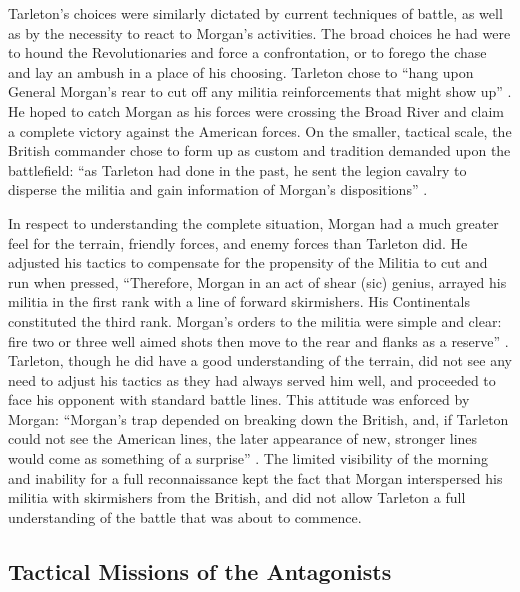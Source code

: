 Tarleton's choices were similarly dictated by current techniques of battle, as
well as by the necessity to react to Morgan's activities.  The broad choices he
had were to hound the Revolutionaries and force a confrontation, or to forego
the chase and lay an ambush in a place of his choosing.  Tarleton chose to ``hang
upon General Morgan's rear to cut off any militia reinforcements that might show
up'' \cite[46]{fleming_cowpens_1988}.  He hoped to catch Morgan as his forces were crossing the
Broad River and claim a complete victory against the American forces.  On the
smaller, tactical scale, the British commander chose to form up as custom and
tradition demanded upon the battlefield:  ``as Tarleton had done in the past, he
sent the legion cavalry to disperse the militia and gain information of Morgan's
dispositions'' \cite[33]{brinkley_back_1998}.

In respect to understanding the complete situation, Morgan had a much greater
feel for the terrain, friendly forces, and enemy forces than Tarleton did.  He
adjusted his tactics to compensate for the propensity of the Militia to cut and
run when pressed, “Therefore, Morgan in an act of shear (sic) genius, arrayed
his militia in the first rank with a line of forward skirmishers.  His
Continentals constituted the third rank.  Morgan’s orders to the militia were
simple and clear: fire two or three well aimed shots then move to the rear and
flanks as a reserve'' \cite[32]{brinkley_back_1998}. Tarleton, though he did have a good
understanding of the terrain, did not see any need to adjust his tactics as they
had always served him well, and proceeded to face his opponent with standard
battle lines.  This attitude was enforced by Morgan: ``Morgan's trap depended on
breaking down the British, and, if Tarleton could not see the American lines,
the later appearance of new, stronger lines would come as something of a
surprise'' \cite[82]{babits_devil_2001}.  The limited visibility of the morning and inability
for a full reconnaissance kept the fact that Morgan interspersed his militia
with skirmishers from the British, and did not allow Tarleton  a full
understanding of the battle that was about to commence.

\subsection{Tactical Missions of the Antagonists}


